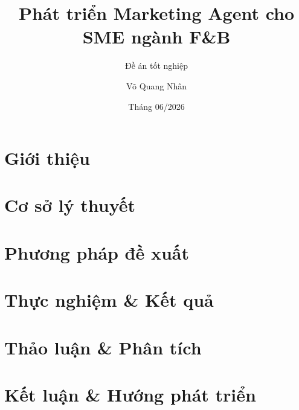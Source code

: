\documentclass[aspectratio=169,11pt]{beamer}
\title{Phát triển Marketing Agent cho SME ngành F\&B}
\subtitle{Đề án tốt nghiệp}
\author{Võ Quang Nhân}
\institute{Trường Đại học Bách Khoa -- ĐHQG TP.HCM}
\date{Tháng 06/2026}
\begin{document}



\section{Giới thiệu}






\section{Cơ sở lý thuyết}


















\section{Phương pháp đề xuất}





\section{Thực nghiệm \& Kết quả}






\section{Thảo luận \& Phân tích}



\section{Kết luận \& Hướng phát triển}


\end{document}
